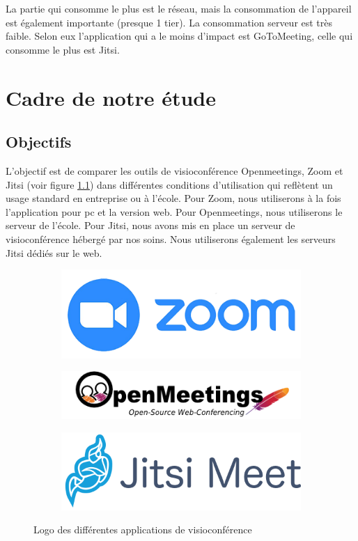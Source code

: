 \documentclass[11pt,a4paper]{report}
\begin{document}
La partie qui consomme le plus est le réseau, mais la consommation de l'appareil est également importante (presque 1 tier). La consommation serveur est très faible. Selon eux l'application qui a le moins d'impact est GoToMeeting, celle qui consomme le plus est Jitsi.

\chapter{Cadre de notre étude}
\section{Objectifs}
L'objectif est de comparer les outils de visioconférence Openmeetings, Zoom et Jitsi (voir figure \ref{fig:logos}) dans différentes conditions d'utilisation qui reflètent un usage standard en entreprise ou à l'école. Pour Zoom, nous utiliserons à la fois l'application pour pc et la version web. Pour Openmeetings, nous utiliserons le serveur de l'école. Pour Jitsi, nous avons mis en place un serveur de visioconférence hébergé par nos soins. Nous utiliserons également les serveurs Jitsi dédiés sur le web.

\begin{figure}[h]
\begin{subfigure}
  \centering
  \includegraphics[width=.3\linewidth]{zoom-logo (1).png}
\end{subfigure}
\begin{subfigure}
  \centering
  \includegraphics[width=.3\linewidth]{logo.png}
\end{subfigure}
\begin{subfigure}
  \centering
  \includegraphics[width=.3\linewidth]{logo-jitsi-meet.png}
\end{subfigure}
\caption{Logo des différentes applications de visioconférence}
\label{fig:logos}
\end{figure}
\end{document}
